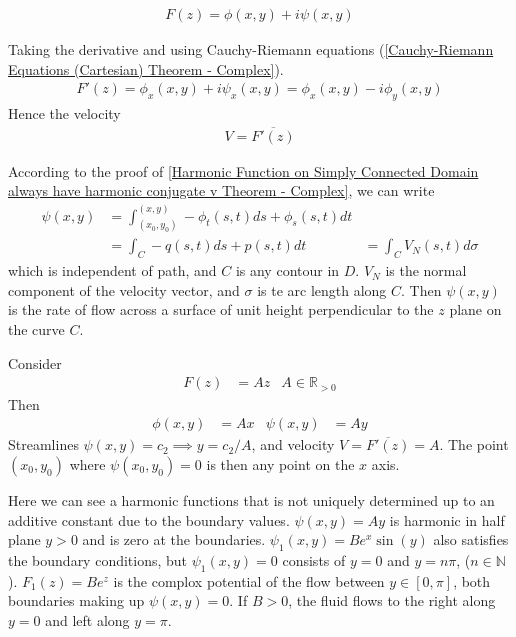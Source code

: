 \documentclass[12pt, english]{book}
\begin{document}
	\begin{definition}
		\label{Complex Potential (Flow) Definition - Complex}
		\begin{align*}
			F(z) = \phi(x,y) + i \psi(x,y)
		\end{align*}
	\end{definition}
	
	Taking the derivative and using Cauchy-Riemann equations (\cref{Cauchy-Riemann Equations (Cartesian) Theorem - Complex}).
	\begin{align*}
		F'(z) = \phi_x(x,y) + i\psi_x(x,y) = \phi_x(x,y) - i \phi_y(x,y)
	\end{align*}
	Hence the velocity
	\begin{align*}
		V = \overline{F'(z)}
	\end{align*}
	
	According to the proof of \cref{Harmonic Function on Simply Connected Domain always have harmonic conjugate v Theorem - Complex}, we can write
	\begin{align*}
		\psi(x,y) 
		&= \int_{(x_0, y_0)}^{(x,y)} - \phi_t(s,t) ds + \phi_s(s,t) dt \\
		&= \int_C - q(s,t) ds + p(s,t) dt
		&= \int_{C} V_N (s,t) d\sigma
	\end{align*}
	which is independent of path, and \(C\) is any contour in \(D\). \(V_N\) is the normal component of the velocity vector, and \(\sigma\) is te arc length along \(C\). Then \(\psi(x,y)\) is the rate of flow across a surface of unit height perpendicular to the \(z\) plane on the curve \(C\).
	
	\begin{example}
		Consider 
		\begin{align*}
			F(z) &= Az & A \in \mathbb{R}_{>0}
		\end{align*}
		Then
		\begin{align*}
			\phi(x,y) &= Ax &
			\psi(x,y) &= Ay
		\end{align*}
		Streamlines \(\psi(x,y) = c_2 \implies y = c_2 /A\), and velocity \(V = \overline{F'(z)} = A\). The point \((x_0, y_0)\) where \(\psi(x_0, y_0) = 0\) is then any point on the \(x\) axis. 
		
		Here we can see a harmonic functions that is not uniquely determined up to an additive constant due to the boundary values. \(\psi(x,y) = Ay\) is harmonic in half plane \(y>0\) and is zero at the boundaries. \(\psi_1(x,y) = Be^x \sin(y)\) also satisfies the boundary conditions, but \(\psi_1(x,y) = 0\) consists of \(y = 0\) and \(y = n \pi\), (\(n \in \mathbb{N}\)). \(F_1(z) = Be^z\) is the complox potential of the flow between \(y \in [0, \pi]\), both boundaries making up \(\psi(x,y) = 0\). If \(B>0\), the fluid flows to the right along \(y = 0\) and left along \(y = \pi\).
	\end{example}
\end{document}
